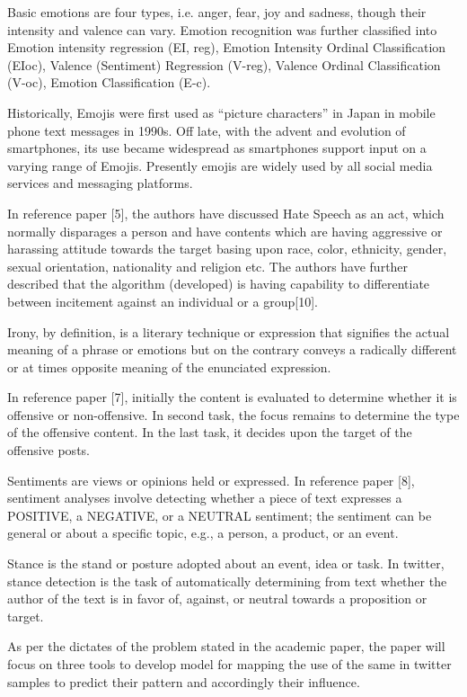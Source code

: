 \documentclass[a4paper]{article}
\begin{document}
Basic emotions are four types, i.e. anger, fear, joy and sadness, though their intensity and valence can vary. Emotion recognition was further classified into Emotion intensity regression (EI, reg), Emotion Intensity Ordinal Classification (EIoc), Valence (Sentiment) Regression (V-reg), Valence Ordinal Classification (V-oc), Emotion Classification (E-c). 

Historically, Emojis were first used as “picture characters” in Japan in mobile phone text messages in 1990s. Off late, with the advent and evolution of smartphones, its use became widespread as smartphones support input on a varying range of Emojis.  Presently emojis are widely used by all social media services and messaging platforms. 

In reference paper [5], the authors have discussed Hate Speech as an act, which normally disparages a person and have contents which are having aggressive or harassing attitude towards the target basing upon race, color, ethnicity, gender, sexual orientation, nationality and religion etc. The authors have further described that the algorithm (developed) is having capability to differentiate between incitement against an individual or a group[10].

Irony, by definition, is a literary technique or expression that signifies the actual meaning of a phrase or emotions but on the contrary conveys a radically different or at times opposite meaning of the enunciated expression.  

In reference paper [7], initially the content is evaluated to determine whether it is offensive or non-offensive. In second task, the focus remains to determine the type of the offensive content. In the last task, it decides upon the target of the offensive posts.  

Sentiments are views or opinions held or expressed. In reference paper [8], sentiment analyses involve detecting whether a piece of text expresses a POSITIVE, a NEGATIVE, or a NEUTRAL sentiment; the sentiment can be general or about a specific topic, e.g., a person, a product, or an event.

Stance is the stand or posture adopted about an event, idea or task. In twitter, stance detection is the task of automatically determining from text whether the author of the text is in favor of, against, or neutral towards a proposition or target.

As per the dictates of the problem stated in the academic paper, the paper will focus on three tools to develop model for mapping the use of the same in twitter samples to predict their pattern and accordingly their influence. 
\end{document}
